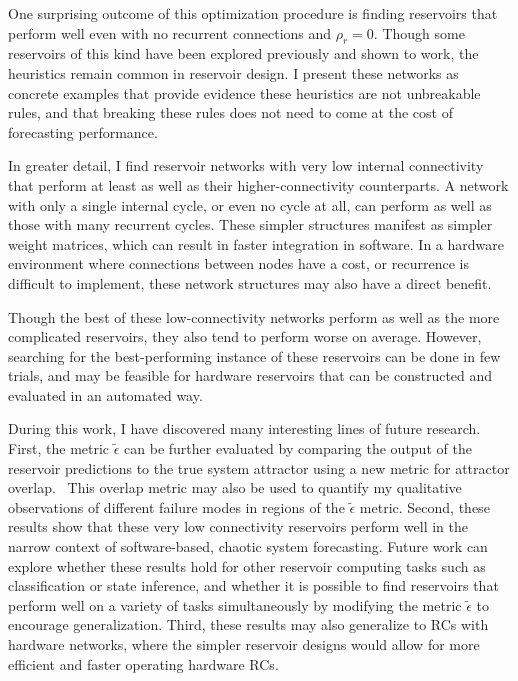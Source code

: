 One surprising outcome of this optimization procedure is finding
reservoirs that perform well even with no recurrent connections and
$\rho_r=0$.  Though some reservoirs of this kind have been explored
previously and shown to work,\cite{pathak2017,rodan2011} the
heuristics remain common in reservoir design. I present these networks
as concrete examples that provide evidence these heuristics are not
unbreakable rules, and that breaking these rules does not need to come
at the cost of forecasting performance.

In greater detail, I find reservoir networks with very low internal
connectivity that perform at least as well as their
higher-connectivity counterparts. A network with only a single
internal cycle, or even no cycle at all, can perform as well as those
with many recurrent cycles. These simpler structures manifest as
simpler weight matrices, which can result in faster integration in
software. In a hardware environment where connections between nodes
have a cost, or recurrence is difficult to implement, these network
structures may also have a direct benefit.

Though the best of these low-connectivity networks perform as well
as the more complicated reservoirs, they also tend to perform worse on
average. However, searching for the best-performing instance of these
reservoirs can be done in few trials, and may be feasible for hardware
reservoirs that can be constructed and evaluated in an automated way.

During this work, I have discovered many interesting lines of future
research. First, the metric $\tilde{\epsilon}$ can be further evaluated by
comparing the output of the reservoir predictions to the true system
attractor using a new metric for attractor overlap.~\cite{ishar2019}
This overlap metric may also be used to quantify my qualitative
observations of different failure modes in regions of the
$\tilde{\epsilon}$ metric. Second, these results show that these very
low connectivity reservoirs perform well in the narrow context of
software-based, chaotic system forecasting. Future work can explore
whether these results hold for other reservoir computing tasks such as
classification or state inference, and whether it is possible to find reservoirs that
perform well on a variety of tasks simultaneously by modifying the
metric $\tilde{\epsilon}$ to encourage generalization. Third, these
results may also generalize to RCs with hardware networks, where the
simpler reservoir designs would allow for more efficient and faster
operating hardware RCs.

